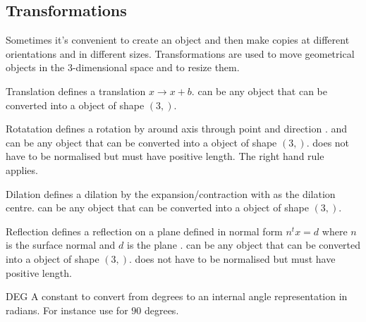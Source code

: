\subsection{Transformations}

Sometimes it's convenient to create an object and then make copies at
different orientations and in different sizes.  Transformations are
used to move geometrical objects in the 3-dimensional space and to
resize them.

\begin{classdesc}{Translation}{}
defines a translation $x \to x+b$.  can be any object that can be converted 
into a \numpy object of shape $(3,)$.
\end{classdesc}
              
\begin{classdesc}{Rotatation}{ }
defines a rotation by  around axis through point  and direction . 
 and  can be any object that can be converted 
into a \numpy object of shape $(3,)$.
 does not have to be normalised but must have positive length. The right hand rule~\cite{RIGHTHANDRULE}
applies.
\end{classdesc}


\begin{classdesc}{Dilation}{}
defines a dilation by the expansion/contraction  with 
 as the dilation centre.
 can be any object that can be converted 
into a \numpy object of shape $(3,)$.
\end{classdesc}

\begin{classdesc}{Reflection}{}
defines a reflection on a plane defined in normal form $n^t x = d$ 
where $n$ is the surface normal  and $d$ is the plane .
 can be any object that can be converted 
into a \numpy object of shape $(3,)$.
 does not have to be normalised but must have positive length. 
\end{classdesc}

\begin{datadesc}{DEG}
A constant to convert from degrees to an internal angle representation in radians. For instance use  for $90$ degrees.
\end{datadesc}

